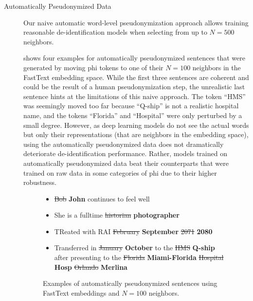 \begin{description}
    \item[Automatically Pseudonymized Data]
    Our naive automatic word-level pseudonymization approach allows training reasonable de-identification models when selecting from up to $N=500$ neighbors.
    
     shows four examples for automatically pseudonymized sentences that were generated by moving \ac{phi} tokens to one of their $N=100$ neighbors in the FastText embedding space.
    While the first three sentences are coherent and could be the result of a human pseudonymization step, the unrealistic last sentence hints at the limitations of this naive approach.
    The token ``HMS'' was seemingly moved too far because ``Q-ship'' is not a realistic hospital name, and the tokens ``Florida'' and ``Hospital'' were only perturbed by a small degree.
    However, as deep learning models do not see the actual words but only their representations (that are neighbors in the embedding space), using the automatically pseudonymized data does not dramatically deteriorate de-identification performance.
    Rather, models trained on automatically pseudonymized data beat their counterparts that were trained on raw data in some categories of \ac{phi} due to their higher robustness.
    
    \begin{figure}
        \begin{framed}
            \begin{itemize}[noitemsep,topsep=0pt,parsep=0pt,partopsep=0pt,leftmargin=*]
                \item \sout{Bob} \textbf{John} continues to feel well
                \item She is a fulltime \sout{historian} \textbf{photographer}
                \item TReated with RAI \sout{February} \textbf{September} \sout{2071} \textbf{2080}
                \item  Transferred in \sout{January} \textbf{October} to the \sout{HMS} \textbf{Q-ship} after presenting to the \sout{Florida} \textbf{Miami-Florida} \sout{Hospital} \textbf{Hosp} \sout{Orlando} \textbf{Merlina}
            \end{itemize}
        \end{framed}
        \caption[Automatically pseudonymized data.]{Examples of automatically pseudonymized sentences using FastText embeddings and $N=100$ neighbors.}\label{fig:pseudonymizations}
    \end{figure}
    

\end{description}
